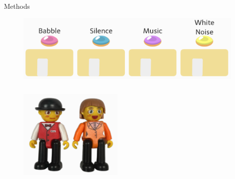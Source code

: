 \documentclass[final]{beamer}
\newlength{\colwidth}
\begin{document}
\begin{frame}[t]
\begin{columns}[t]
\begin{column}{\colwidth}
\begin{block}{Methods}
\begin{itemize}
    \end{itemize}

    \begin{figure}
      \includegraphics[width = 10in]{../writeup/figs/houses.png}
    \end{figure}
    
    \begin{figure}
      \hfill
      \includegraphics[width = 2in, height = 2in]{../writeup/figs/joemandy.png} \hspace{1in}
    \end{figure}

    \vspace{-0.8in}


\end{block}
\end{column}
\end{columns}
\end{frame}
\end{document}
